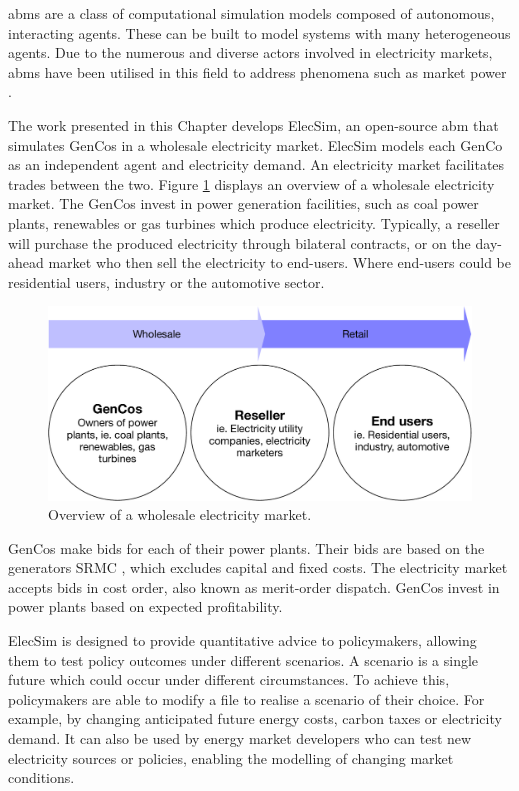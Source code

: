 \acrfull{abms} are a class of computational simulation models composed of autonomous, interacting agents. These can be built to model systems with many heterogeneous agents. Due to the numerous and diverse actors involved in electricity markets, \acrshort{abms} have been utilised in this field to address phenomena such as market power \cite{Ringler2016a}. 

The work presented in this Chapter develops ElecSim, an open-source \acrshort{abm} that simulates GenCos in a wholesale electricity market. ElecSim models each GenCo as an independent agent and electricity demand. An electricity market facilitates trades between the two. Figure \ref{fig:elec_market_overview} displays an overview of a wholesale electricity market. The GenCos invest in power generation facilities, such as coal power plants, renewables or gas turbines which produce electricity. Typically, a reseller will purchase the produced electricity through bilateral contracts, or on the day-ahead market who then sell the electricity to end-users. Where end-users could be residential users, industry or the automotive sector.

\begin{figure}
	\centering
	\includegraphics[width=0.85\linewidth]{Chapter4/figures/omnigraffle/market_structure.pdf}
	\caption{Overview of a wholesale electricity market.}
	\label{fig:elec_market_overview}
\end{figure}


GenCos make bids for each of their power plants. Their bids are based on the generators \gls{SRMC} \cite{Perloff2012}, which excludes capital and fixed costs. The electricity market accepts bids in cost order, also known as merit-order dispatch. GenCos invest in power plants based on expected profitability.	

ElecSim is designed to provide quantitative advice to policymakers, allowing them to test policy outcomes under different scenarios. A scenario is a single future which could occur under different circumstances. To achieve this, policymakers are able to modify a file to realise a scenario of their choice. For example, by changing anticipated future energy costs, carbon taxes or electricity demand. It can also be used by energy market developers who can test new electricity sources or policies, enabling the modelling of changing market conditions.

